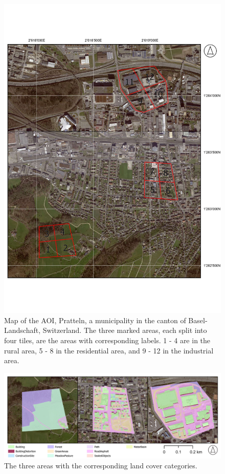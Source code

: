 \begin{figure}[H]
    \centering
    \captionsetup{width=0.8\linewidth}
    \includegraphics[scale=0.9, trim=-1.1cm 2cm 0cm 2cm, clip]{figures/map_aoi.pdf}
    \caption{Map of the AOI, Pratteln, a municipality in the canton of Basel-Landschaft, Switzerland. 
    The three marked areas, each split into four tiles, are the areas with corresponding labels. 1 - 4 are in the rural area,
    5 - 8 in the residential area, and 9 - 12 in the industrial area.}
    \label{fig:aoi_labeled}
\end{figure}

\begin{figure}[H]
    \centering
    \captionsetup{width=0.8\linewidth}
    \includegraphics[width=\linewidth]{figures/map_aoi_category.pdf}
    \caption{The three areas with the corresponding land cover categories.}
    \label{fig:category_areas}
\end{figure}

